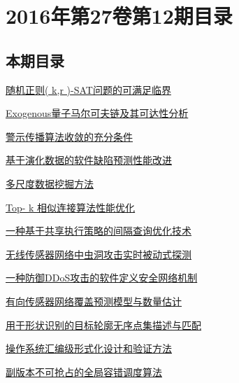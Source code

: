 \documentclass[a4paper]{article}
\begin{document}
\section{\textbf{2016年第27卷第12期目录}}
\subsection{本期目录}
\href{http://www.jos.org.cn/ch/reader/create_pdf.aspx?file_no=5129&year_id=2016&quarter_id=12&falg=1}{随机正则( k,r )-SAT问题的可满足临界}

\href{http://www.jos.org.cn/ch/reader/create_pdf.aspx?file_no=4916&year_id=2016&quarter_id=12&falg=1}{Exogenous量子马尔可夫链及其可达性分析}

\href{http://www.jos.org.cn/ch/reader/create_pdf.aspx?file_no=4940&year_id=2016&quarter_id=12&falg=1}{警示传播算法收敛的充分条件}

\href{http://www.jos.org.cn/ch/reader/create_pdf.aspx?file_no=4869&year_id=2016&quarter_id=12&falg=1}{基于演化数据的软件缺陷预测性能改进}

\href{http://www.jos.org.cn/ch/reader/create_pdf.aspx?file_no=4924&year_id=2016&quarter_id=12&falg=1}{多尺度数据挖掘方法}

\href{http://www.jos.org.cn/ch/reader/create_pdf.aspx?file_no=5012&year_id=2016&quarter_id=12&falg=1}{Top- k 相似连接算法性能优化}

\href{http://www.jos.org.cn/ch/reader/create_pdf.aspx?file_no=5013&year_id=2016&quarter_id=12&falg=1}{一种基于共享执行策略的间隔查询优化技术}

\href{http://www.jos.org.cn/ch/reader/create_pdf.aspx?file_no=4938&year_id=2016&quarter_id=12&falg=1}{无线传感器网络中虫洞攻击实时被动式探测}

\href{http://www.jos.org.cn/ch/reader/create_pdf.aspx?file_no=4942&year_id=2016&quarter_id=12&falg=1}{一种防御DDoS攻击的软件定义安全网络机制}

\href{http://www.jos.org.cn/ch/reader/create_pdf.aspx?file_no=4949&year_id=2016&quarter_id=12&falg=1}{有向传感器网络覆盖预测模型与数量估计}

\href{http://www.jos.org.cn/ch/reader/create_pdf.aspx?file_no=5101&year_id=2016&quarter_id=12&falg=1}{用于形状识别的目标轮廓无序点集描述与匹配}

\href{http://www.jos.org.cn/ch/reader/create_pdf.aspx?file_no=4851&year_id=2016&quarter_id=12&falg=1}{操作系统汇编级形式化设计和验证方法}

\href{http://www.jos.org.cn/ch/reader/create_pdf.aspx?file_no=4917&year_id=2016&quarter_id=12&falg=1}{副版本不可抢占的全局容错调度算法}
\end{document}
